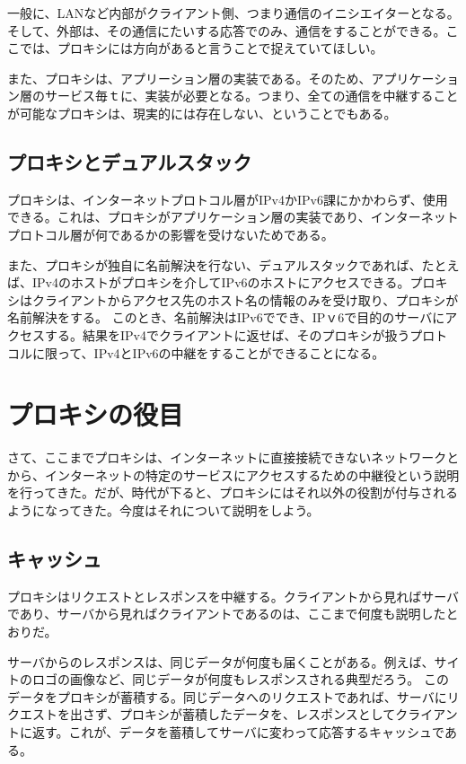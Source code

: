 一般に、LANなど内部がクライアント側、つまり通信のイニシエイターとなる。そして、外部は、その通信にたいする応答でのみ、通信をすることができる。ここでは、プロキシには方向があると言うことで捉えていてほしい。

また、プロキシは、アプリーション層の実装である。そのため、アプリケーション層のサービス毎ｔに、実装が必要となる。つまり、全ての通信を中継することが可能なプロキシは、現実的には存在しない、ということでもある。

\subsection{プロキシとデュアルスタック}
プロキシは、インターネットプロトコル層がIPv4かIPv6課にかかわらず、使用できる。これは、プロキシがアプリケーション層の実装であり、インターネットプロトコル層が何であるかの影響を受けないためである。

また、プロキシが独自に名前解決を行ない、デュアルスタックであれば、たとえば、IPv4のホストがプロキシを介してIPv6のホストにアクセスできる。プロキシはクライアントからアクセス先のホスト名の情報のみを受け取り、プロキシが名前解決をする。
このとき、名前解決はIPv6ででき、IPｖ6で目的のサーバにアクセスする。結果をIPv4でクライアントに返せば、そのプロキシが扱うプロトコルに限って、IPv4とIPv6の中継をすることができることになる。


\section{プロキシの役目}

さて、ここまでプロキシは、インターネットに直接接続できないネットワークとから、インターネットの特定のサービスにアクセスするための中継役という説明を行ってきた。だが、時代が下ると、プロキシにはそれ以外の役割が付与されるようになってきた。今度はそれについて説明をしよう。

\subsection{キャッシュ}
プロキシはリクエストとレスポンスを中継する。クライアントから見ればサーバであり、サーバから見ればクライアントであるのは、ここまで何度も説明したとおりだ。

サーバからのレスポンスは、同じデータが何度も届くことがある。例えば、サイトのロゴの画像など、同じデータが何度もレスポンスされる典型だろう。
このデータをプロキシが蓄積する。同じデータへのリクエストであれば、サーバにリクエストを出さず、プロキシが蓄積したデータを、レスポンスとしてクライアントに返す。これが、データを蓄積してサーバに変わって応答するキャッシュである。

